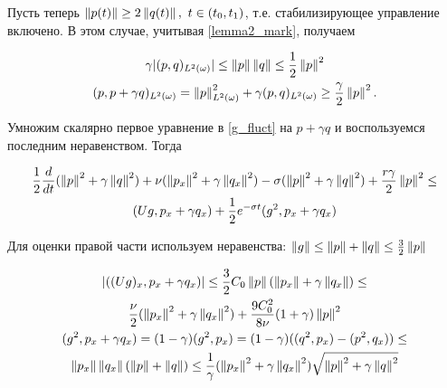 Пусть теперь $\left\lVert p(t)\right\rVert \ge 2 \left\lVert q(t)\right\rVert, \ t \in (t_0, t_1)$, т.е.
стабилизирующее управление включено. В этом случае, учитывая
\eqref{lemma2_mark}, получаем

\begin{gather*}
    \gamma |(p, q)_{L^2(\omega)}| \le \left\lVert p\right\rVert \left\lVert q\right\rVert \le \frac{1}{2}
    \left\lVert p\right\rVert^2\\
    (p, p + \gamma q)_{L^2(\omega)} = \left\lVert p\right\rVert^2_{L^2(\omega)} + \gamma(p,
    q)_{L^2(\omega)} \ge \frac{\gamma}{2}\left\lVert p\right\rVert^2.
\end{gather*}

Умножим скалярно первое уравнение в \eqref{g_fluct} на $p + \gamma q$ и
воспользуемся последним неравенством. Тогда

\begin{gather*}
    \frac{1}{2} \frac{d}{dt} (\left\lVert p\right\rVert^2 + \gamma \left\lVert q\right\rVert^2) + \nu
    (\left\lVert p_x\right\rVert^2 + \gamma \left\lVert q_x\right\rVert^2) - \sigma (\left\lVert p\right\rVert^2 + \gamma
    \left\lVert q\right\rVert^2) + \frac{r\gamma}{2} \left\lVert p\right\rVert^2 \le \\
    (Ug, p_x + \gamma q_x) +
    \frac{1}{2} e^{-\sigma t}(g^2, p_x + \gamma q_x)
\end{gather*}

Для оценки правой части используем неравенства: $\left\lVert g\right\rVert \le \left\lVert p\right\rVert + 
\left\lVert q\right\rVert \le \frac{3}{2} \left\lVert p\right\rVert$

\begin{gather*}
    |((U g)_x, p_x + \gamma q_x)| \le \frac{3}{2} C_0 \left\lVert p\right\rVert(\left\lVert p_x\right\rVert +
    \gamma \left\lVert q_x\right\rVert) \le \\
    \frac{\nu}{2} (\left\lVert p_x\right\rVert^2 + \gamma \left\lVert q_x\right\rVert^2) +
    \frac{9C_0^2}{8\nu}(1 + \gamma)\left\lVert p\right\rVert^2\\
    (g^2, p_x + \gamma q_x) = (1 - \gamma)(g^2, p_x) = (1 - \gamma)((q^2, p_x) -
    (p^2, q_x)) \le \\
    \left\lVert p_x\right\rVert\left\lVert q_x\right\rVert(\left\lVert p\right\rVert + \left\lVert q\right\rVert) \le \frac{1}{\gamma}(\left\lVert p_x\right\rVert^2
    + \gamma \left\lVert q_x\right\rVert^2)\sqrt{\left\lVert p\right\rVert^2 + \gamma \left\lVert q\right\rVert^2}
\end{gather*}

